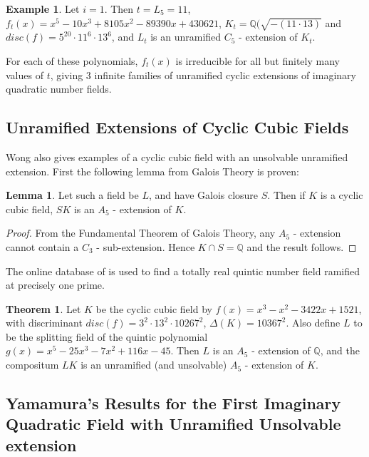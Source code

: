 \documentclass[12pt]{extarticle}
\newcommand{\Q}{\mathbb{Q}}
\newcommand{\<}{\langle}
\renewcommand{\>}{\rangle}
\theoremstyle{definition}
\newtheorem{theorem}{Theorem}
\newtheorem*{example}{Example}
\newtheorem{lemma}{Lemma}
\begin{document}
\begin{example}
Let $i=1$. Then $t=L_{5} = 11$, $f_t(x) = x^5 - 10x^3 + 8105x^2 - 89390x + 430621$, $K_t = \Q(\sqrt{-( 11 \cdot13)}$ and $disc(f) =5^{20} \cdot 11^6 \cdot 13^6
$,  and $L_t$ is an unramified $C_5$ - extension of $K_t$. 
\end{example}
For each of these polynomials, $f_t(x)$ is irreducible for all but finitely many values of $t$, giving 3 infinite families of unramified cyclic extensions of imaginary quadratic number fields. 


\subsection{Unramified Extensions of Cyclic Cubic Fields}
Wong \cite{WONG} also gives examples of a cyclic cubic field with an unsolvable unramified extension.
First the following lemma from Galois Theory is proven:

\begin{lemma}
 Let such a field be $L$, and have Galois closure $S$. Then if $K$ is a cyclic cubic field, $SK$ is an $A_5$ - extension of $K$.
\end{lemma}
\begin{proof}
From the Fundamental Theorem of Galois Theory, any $A_5$ - extension cannot contain a $C_3$ - sub-extension. Hence $K \cap S = \Q$ and the result follows.
\end{proof}


The online database of \cite{JONE2} is used to find a totally real quintic number field ramified at precisely one prime. 


\begin{theorem}
Let $K$ be the cyclic cubic field by $f(x) = x^3 - x^2 - 3422x + 1521$, with discriminant $disc(f) = 3^2 \cdot 13^2 \cdot 10267^2$, $\Delta(K) = 10367^2$. Also define $L$ to be the splitting field of the quintic polynomial $g(x) = x^5 - 25x^3 - 7x^2 + 116x - 45$. Then $L$ is an $A_5$ - extension of $\Q$, and the compositum $LK$ is an unramified (and unsolvable) $A_5$ - extension of $K$.
\end{theorem}




\subsection{Yamamura's Results for the First Imaginary Quadratic Field with Unramified Unsolvable extension}
\end{document}
